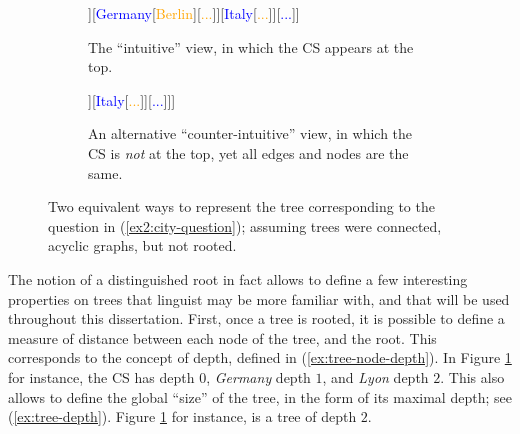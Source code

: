 \begin{figure}[H]
	\centering
	\begin{subfigure}[t]{.45\linewidth}
		\centering
		\begin{forest}
			[{CS\\
				Jo grew up in...}[\textcolor{blue}{France}[\textcolor{orange}{{Paris}}][\textcolor{orange}{Lyon}][\textcolor{orange}{...}]][\textcolor{blue}{Germany}[\textcolor{orange}{Berlin}][\textcolor{orange}{...}]][\textcolor{blue}{Italy}[\textcolor{orange}{...}]][\textcolor{blue}{...}]]
		\end{forest}
		\caption{The ``intuitive'' view, in which the CS appears at the top.}\label{fig2:city-tree-repeated}
	\end{subfigure}
	\hfill
	\begin{subfigure}[t]{.45\linewidth}
		\centering
		\begin{forest}
			[\textcolor{blue}{France}[\textcolor{orange}{Paris}][\textcolor{orange}{Lyon}][\textcolor{orange}{...}][CS[\textcolor{blue}{Germany}[\textcolor{orange}{Berlin}][\textcolor{orange}{...}]][\textcolor{blue}{Italy}[\textcolor{orange}{...}]][\textcolor{blue}{...}]]]
		\end{forest}
		\caption{An alternative ``counter-intuitive'' view, in which the CS is \textit{not} at the top, yet all edges and nodes are the same.}\label{fig2:city-tree-france-root}
	\end{subfigure}
	\caption{Two equivalent ways to represent the tree corresponding to the question in (\ref{ex2:city-question}); assuming trees were connected, acyclic graphs, but not rooted.}
\end{figure}


The notion of a distinguished root in fact allows to define a few interesting properties on trees that linguist may be more familiar with, and that will be used throughout this dissertation. First, once a tree is rooted, it is possible to define a measure of distance between each node of the tree, and the root. This corresponds to the concept of depth, defined in (\ref{ex:tree-node-depth}). In Figure \ref{fig2:city-tree-repeated} for instance, the CS has depth $0$, \textit{Germany} depth $1$, and \textit{Lyon} depth $2$. This also allows to define the global ``size'' of the tree, in the form of its maximal depth; see (\ref{ex:tree-depth}). Figure \ref{fig2:city-tree-repeated} for instance, is a tree of depth $2$.

